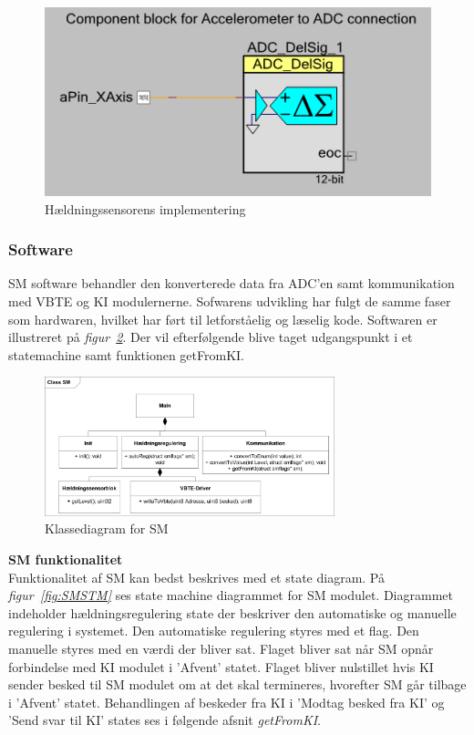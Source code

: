 \begin{figure}[htbp]
	\centering
	\includegraphics[scale=0.8]{billeder/levelsensor}
	\caption{Hældningssensorens implementering}
	\label{fig:levelsensor}
\end{figure}
\subsubsection{Software}
SM software behandler den konverterede data fra ADC'en samt kommunikation med VBTE og KI modulernerne. Sofwarens udvikling har fulgt de samme faser som hardwaren, hvilket har ført til letforståelig og læselig kode. Softwaren er illustreret på \textit{figur~\ref{fig:SMKD}}. Der vil efterfølgende blive taget udgangspunkt i et statemachine samt funktionen getFromKI.
\begin{figure}[H]
	\centering
	\includegraphics[width=0.75\textwidth]{billeder/smKlassediagram}
	\caption{Klassediagram for SM}
	\label{fig:SMKD}
\end{figure}
\textbf{SM funktionalitet}\\
Funktionalitet af SM kan bedst beskrives med et state diagram. På \textit{figur~\ref{fig:SMSTM}} ses  state machine diagrammet for SM modulet. Diagrammet indeholder hældningsregulering state der beskriver den automatiske og manuelle regulering i systemet. Den automatiske regulering styres med et flag. Den manuelle styres med en værdi der bliver sat. Flaget bliver sat når SM opnår forbindelse med KI modulet i 'Afvent' statet. Flaget bliver nulstillet hvis KI sender besked til SM modulet om at det skal termineres, hvorefter SM går tilbage i 'Afvent' statet. Behandlingen af beskeder fra KI i 'Modtag besked fra KI' og 'Send svar til KI' states ses i følgende afsnit \textit{getFromKI}.
